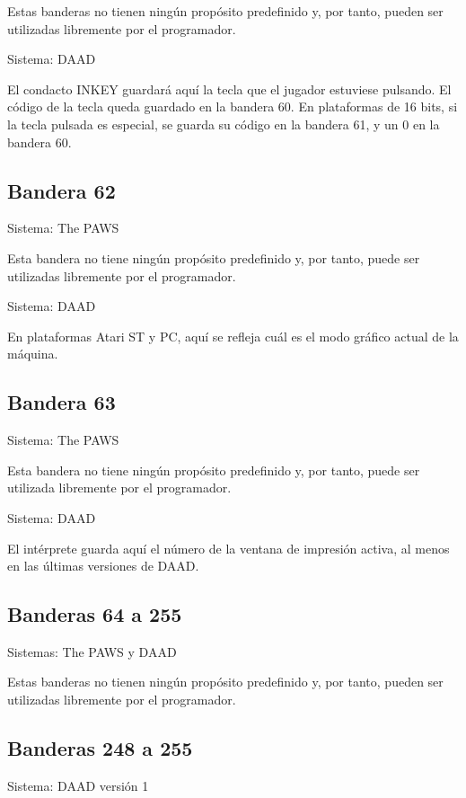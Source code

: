 \documentclass[11pt, a5paper]{article}
\newcommand{\paw}{\textsf{The PAWS}\xspace}
\newcommand{\daad}{\textsf{DAAD}\xspace}
\newcommand{\sistema}[1]{\noindent Sistema: #1 \nopagebreak}
\newcommand{\sistemas}[1]{\noindent Sistemas: #1 \nopagebreak}
\begin{document}
Estas banderas no tienen ningún propósito predefinido y, por tanto, pueden ser utilizadas libremente por el programador.

\sistema{\daad}

El condacto INKEY guardará aquí la tecla que el jugador estuviese pulsando. El código de la tecla queda guardado en la bandera 60. En plataformas de 16 bits, si la tecla pulsada es especial, se guarda su código en la bandera 61, y un 0 en la bandera 60. \cite[págs. 25, 61 y 62]{DAAD}

\subsection{Bandera 62}

\sistema{\paw}

Esta bandera no tiene ningún propósito predefinido y, por tanto, puede ser utilizadas libremente por el programador.

\sistema{\daad}

En plataformas Atari ST y PC, aquí se refleja cuál es el modo gráfico actual de la máquina. \cite[pág. 62]{DAAD}

\subsection{Bandera 63}

\sistema{\paw}

Esta bandera no tiene ningún propósito predefinido y, por tanto, puede ser utilizada libremente por el programador.

\sistema{\daad}

El intérprete guarda aquí el número de la ventana de impresión activa, al menos en las últimas versiones de \daad. \cite[pág. 62]{DAAD}

\subsection{Banderas 64 a 255}

\sistemas{\paw y \daad}

Estas banderas no tienen ningún propósito predefinido y, por tanto, pueden ser utilizadas libremente por el programador.

\subsection{Banderas 248 a 255}

\sistema{\daad versión 1}
\end{document}
